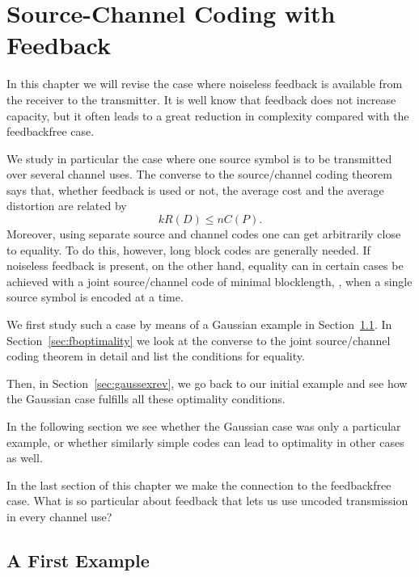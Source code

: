 \chapter{Source-Channel Coding with Feedback}
\label{ch:feedback}

In this chapter we will revise the case where noiseless feedback is available
from the receiver to the transmitter. It is well know that feedback does not
increase capacity, but it often leads to a great reduction in complexity
compared with the feedbackfree case. 

We study in particular the case where one source symbol is to be transmitted
over several channel uses. The converse to the source/channel coding theorem
says that, whether feedback is used or not, the average cost and
the average distortion are related by
\begin{equation*}
  kR(D) \le nC(P).
\end{equation*}
Moreover, using separate source and channel codes one can get arbitrarily close
to equality. To do this, however, long block codes are generally needed. If
noiseless feedback is present, on the other hand, equality can in certain cases
be achieved with a joint source/channel code of minimal blocklength, \ie, when a
single source symbol is encoded at a time. 

We first study such a case by means of a Gaussian example in
Section~\ref{sec:gaussex}. In Section~\ref{sec:fboptimality} we look at the
converse to the joint source/channel coding theorem in detail and list the
conditions for equality. 

Then, in Section~\ref{sec:gaussexrev}, we go back to our initial example and see
how the Gaussian case fulfills all these optimality conditions. 

In the following section we see whether the Gaussian case was only a particular
example, or whether similarly simple codes can lead to optimality in other cases
as well. 

In the last section of this chapter we make the connection to the feedbackfree
case. What is so particular about feedback that lets us use uncoded transmission
in every channel use?



\section{A First Example}
\label{sec:gaussex}

